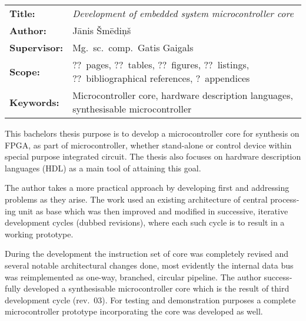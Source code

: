 

\clearpage
\begin{english} %
	\abstitlestyle{\abstractname} %
	\noindent%
	\begin{tabularx}{\textwidth}{lX}
		\textbf{Title:} & 
			\textit{Development of embedded system microcontroller core}\\[1ex]
		\textbf{Author:} & Jānis Šmēdiņš\\[1ex]
		\textbf{Supervisor:} & Mg.~sc.~comp.~Gatis Gaigals\\[1ex]
		\textbf{Scope:} & ??~pages, ??~tables, ??~figures, ??~listings,
			??~bibliographical references, ?~appendices\\[1ex]
		\textbf{Keywords:} & Microcontroller core, hardware description languages,
				synthesisable microcontroller
	\end{tabularx}
	
	\vspace{1em}
	This bachelors thesis purpose is to develop a microcontroller core for
	synthesis on FPGA, as part of microcontroller, whether stand-alone or
	control device within special purpose integrated circuit.
	The thesis also focuses on hardware description languages
	(HDL) as a main tool of attaining this goal.
	
	The author takes a more practical approach by developing first and
	addressing problems as they arise. The work used an existing
	architecture of central processing unit as base which was then improved
	and modified in successive, iterative development cycles
	(dubbed revisions), where each such cycle is to result in a working
	prototype.
	
	During the development the instruction set of core was completely
	revised and several notable architectural changes done, most evidently
	the internal data bus was reimplemented as one-way, branched, circular
	pipeline. The author successfully developed a synthesisable
	microcontroller core which is the result of third development cycle (rev.~03).
	For testing	and demonstration purposes a complete microcontroller prototype
	incorporating the core was developed as well.
	

\end{english}
